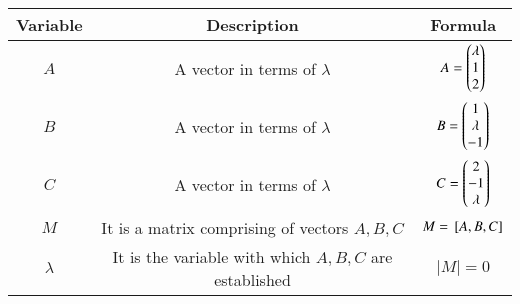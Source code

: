 \begin{center}
    \begin{tabular}{|c|c|c|} 
        \hline
            \textbf{Variable} & \textbf{Description} & \textbf{Formula} \\ 
        \hline
            $A$   & A vector in terms of $\lambda$ & $A = \begin{pmatrix}\lambda \\ 1 \\ 2\end{pmatrix}$ \\ 
        \hline
            $B$   & A vector in terms of $\lambda$ &  $B = \begin{pmatrix}1\\ \lambda \\ -1\end{pmatrix}$\\ 
        \hline
            $C$   & A vector in terms of $\lambda$ & $C  = \begin{pmatrix}2\\-1\\ \lambda\end{pmatrix}$\\ 
        \hline
            $M$   & It is a matrix comprising of vectors $A,B,C$ & $M = {}\left[A,B,C\right]$\\ 
        \hline
            $\lambda$   & It is the variable with which $A,B,C$ are established & $|M|=0$\\ 
        \hline
    \end{tabular}
\end{center}  

